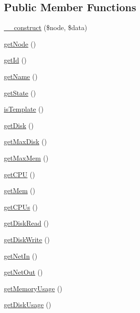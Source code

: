 \subsection*{Public Member Functions}
\begin{DoxyCompactItemize}
\item 
\hyperlink{class_proxmox_node_v_m_a31741cf150e7a0f2664d4e33328be1e8}{\+\_\+\+\_\+construct} (\$node, \$data)
\item 
\hyperlink{class_proxmox_node_v_m_a3a0d17930cbcc57bef84064afcc1a837}{get\+Node} ()
\item 
\hyperlink{class_proxmox_node_v_m_a12251d0c022e9e21c137a105ff683f13}{get\+Id} ()
\item 
\hyperlink{class_proxmox_node_v_m_a3d0963e68bb313b163a73f2803c64600}{get\+Name} ()
\item 
\hyperlink{class_proxmox_node_v_m_afbf787ced76807989fb3093e1772c5a1}{get\+State} ()
\item 
\hyperlink{class_proxmox_node_v_m_a965825ba500d5526200b008e4f5f3029}{is\+Template} ()
\item 
\hyperlink{class_proxmox_node_v_m_a16938d200befaaa1c1c97cdd2221b774}{get\+Disk} ()
\item 
\hyperlink{class_proxmox_node_v_m_a8af01aab0c52dd578e357f9ba6496c13}{get\+Max\+Disk} ()
\item 
\hyperlink{class_proxmox_node_v_m_a94a5b72f76ca4130d47e1c94ffa4e958}{get\+Max\+Mem} ()
\item 
\hyperlink{class_proxmox_node_v_m_a11390c027c03d78c3bda4e40ec384155}{get\+C\+P\+U} ()
\item 
\hyperlink{class_proxmox_node_v_m_a9bbc5ce58f73c826c8c568cf1ece0deb}{get\+Mem} ()
\item 
\hyperlink{class_proxmox_node_v_m_a4a1deab4f6d862bf5153340afe33f69a}{get\+C\+P\+Us} ()
\item 
\hyperlink{class_proxmox_node_v_m_a49f4f88bcf385a2c5bd3f3ef95ca9e1e}{get\+Disk\+Read} ()
\item 
\hyperlink{class_proxmox_node_v_m_aa1217af0501a8ce5ff3b0f455bbb8644}{get\+Disk\+Write} ()
\item 
\hyperlink{class_proxmox_node_v_m_a691abf18d752e0b7802d282916789411}{get\+Net\+In} ()
\item 
\hyperlink{class_proxmox_node_v_m_a9200f47a4e3b49c506b5abe96fa7678e}{get\+Net\+Out} ()
\item 
\hyperlink{class_proxmox_node_v_m_a82fc8c3d55384c54b49784d244b0ed94}{get\+Memory\+Usage} ()
\item 
\hyperlink{class_proxmox_node_v_m_a08ed211a8a23f1a03ec811af6c382230}{get\+Disk\+Usage} ()

\end{DoxyCompactItemize}
